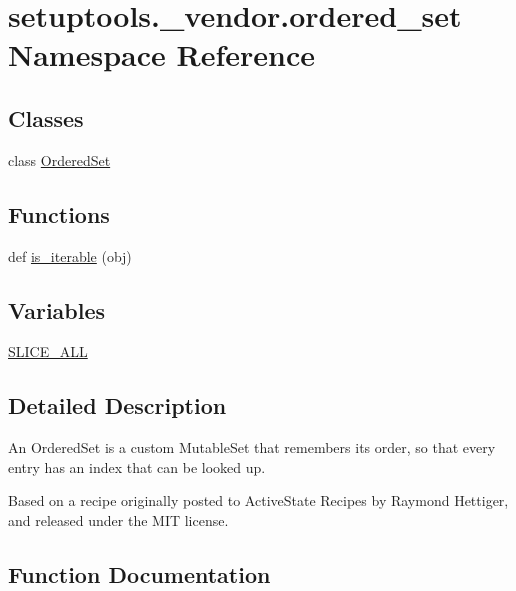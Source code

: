 \hypertarget{namespacesetuptools_1_1__vendor_1_1ordered__set}{}\section{setuptools.\+\_\+vendor.\+ordered\+\_\+set Namespace Reference}
\label{namespacesetuptools_1_1__vendor_1_1ordered__set}
\subsection*{Classes}
\begin{DoxyCompactItemize}
\item 
class \hyperlink{classsetuptools_1_1__vendor_1_1ordered__set_1_1OrderedSet}{Ordered\+Set}
\end{DoxyCompactItemize}
\subsection*{Functions}
\begin{DoxyCompactItemize}
\item 
def \hyperlink{namespacesetuptools_1_1__vendor_1_1ordered__set_a01beb552fed7ce9816e5ffcb877d9560}{is\+\_\+iterable} (obj)
\end{DoxyCompactItemize}
\subsection*{Variables}
\begin{DoxyCompactItemize}
\item 
\hyperlink{namespacesetuptools_1_1__vendor_1_1ordered__set_a71176dd52bbe2f4c416ba37f3efb4ed4}{S\+L\+I\+C\+E\+\_\+\+A\+LL}
\end{DoxyCompactItemize}


\subsection{Detailed Description}
\begin{DoxyVerb}An OrderedSet is a custom MutableSet that remembers its order, so that every
entry has an index that can be looked up.

Based on a recipe originally posted to ActiveState Recipes by Raymond Hettiger,
and released under the MIT license.
\end{DoxyVerb}
 

\subsection{Function Documentation}
\mbox{\label{namespacesetuptools_1_1__vendor_1_1ordered__set_a01beb552fed7ce9816e5ffcb877d9560}} 
